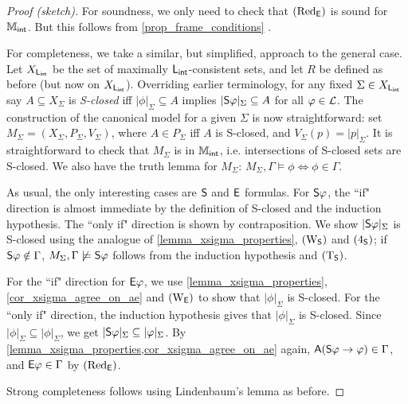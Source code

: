 \begin{proof}[Proof (sketch)]

    For soundness, we only need to check that $\redE$ is sound for $\Mint$. But
    this follows from \cref{prop_frame_conditions}
    .

    For completeness, we take a similar, but simplified, approach to the
    general case. Let $X_{\sLint}$ be the set of maximally $\sLint$-consistent
    sets, and let $R$ be defined as before (but now on $X_{\sLint}$).
    Overriding earlier terminology, for any fixed $\Sigma \in X_{\sLint}$ say
    $A \subseteq X_\Sigma$ is \emph{S-closed} iff $|\phi|_\Sigma \subseteq A$
    implies $|\S\phi|_\Sigma \subseteq A$ for all $\phi \in \cL$.
    The construction of the canonical model for a given $\Sigma$ is now
    straightforward: set $M_\Sigma = (X_\Sigma, P_\Sigma, V_\Sigma)$, where $A
    \in P_\Sigma$ iff $A$ is S-closed, and $V_\Sigma(p) = |p|_\Sigma$.
    It is straightforward to check that $M_\Sigma$ is in $\Mint$, i.e.
    intersections of S-closed sets are S-closed. We also have the truth lemma
    for $M_\Sigma$: $M_\Sigma, \Gamma \models \phi \iff \phi \in \Gamma$.

    As usual, the only interesting cases are $\S$ and $\E$ formulas. For
    $\S\phi$, the ``if" direction is almost immediate by the definition of
    S-closed and the induction hypothesis. The ``only if" direction is shown by
    contraposition. We show $|\S\phi|_\Sigma$ is S-closed using the analogue of
    \cref{lemma_xsigma_properties}, $\weakeningS$ and $\foursoundness$; if
    $\S\phi \notin \Gamma$, $M_\Sigma, \Gamma \not\models \S\phi$ follows from
    the induction hypothesis and $\Tsoundness$.

    For the ``if" direction for $\E\phi$, we use
    \cref{lemma_xsigma_properties}, \cref{cor_xsigma_agree_on_ae} and
    $\weakeningE$ to show that $|\phi|_\Sigma$ is S-closed. For the ``only if"
    direction, the induction hypothesis gives that $|\phi|_\Sigma$ is S-closed.
    Since $|\phi|_\Sigma \subseteq |\phi|_\Sigma$, we get $|\S\phi|_\Sigma
    \subseteq |\phi|_\Sigma$. By
    \cref{lemma_xsigma_properties,cor_xsigma_agree_on_ae} again, $\A(\S\phi
    \limplies \phi) \in \Gamma$, and $\E\phi \in \Gamma$ by $\redE$.

    Strong completeness follows using Lindenbaum's lemma as before.

\end{proof}

